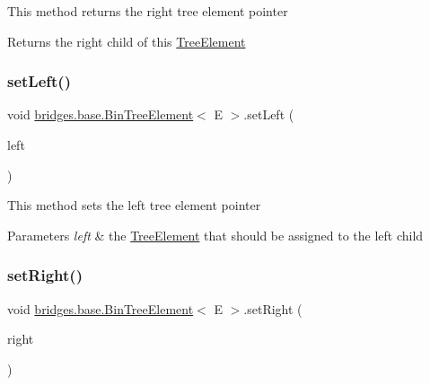 This method returns the right tree element pointer \begin{DoxyReturn}{Returns}
the right child of this \hyperlink{classbridges_1_1base_1_1_tree_element}{Tree\+Element} 
\end{DoxyReturn}
\hypertarget{classbridges_1_1base_1_1_bin_tree_element_a5bcc2c1374a49f7ab2523ce53d204c30}{}\label{classbridges_1_1base_1_1_bin_tree_element_a5bcc2c1374a49f7ab2523ce53d204c30} 
\subsubsection{\texorpdfstring{set\+Left()}{setLeft()}}
{\footnotesize\ttfamily void \hyperlink{classbridges_1_1base_1_1_bin_tree_element}{bridges.\+base.\+Bin\+Tree\+Element}$<$ E $>$.set\+Left (\begin{DoxyParamCaption}\item[{\hyperlink{classbridges_1_1base_1_1_bin_tree_element}{Bin\+Tree\+Element}$<$ E $>$}]{left }\end{DoxyParamCaption})}

This method sets the left tree element pointer 
\begin{DoxyParams}{Parameters}
{\em left} & the \hyperlink{classbridges_1_1base_1_1_tree_element}{Tree\+Element} that should be assigned to the left child \\
\hline
\end{DoxyParams}
\hypertarget{classbridges_1_1base_1_1_bin_tree_element_abc40e3ed4cfaf4b74aacfd3657e89ebc}{}\label{classbridges_1_1base_1_1_bin_tree_element_abc40e3ed4cfaf4b74aacfd3657e89ebc} 
\subsubsection{\texorpdfstring{set\+Right()}{setRight()}}
{\footnotesize\ttfamily void \hyperlink{classbridges_1_1base_1_1_bin_tree_element}{bridges.\+base.\+Bin\+Tree\+Element}$<$ E $>$.set\+Right (\begin{DoxyParamCaption}\item[{\hyperlink{classbridges_1_1base_1_1_bin_tree_element}{Bin\+Tree\+Element}$<$ E $>$}]{right }\end{DoxyParamCaption})}

